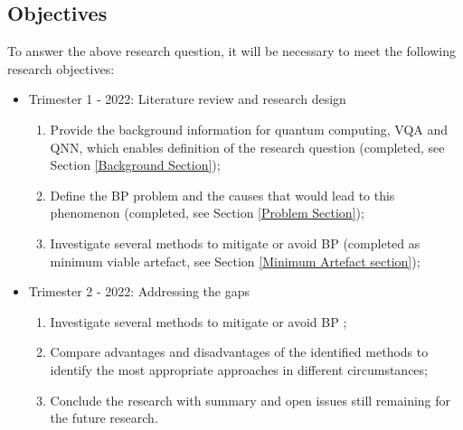 \subsection{Objectives}
To answer the above research question, it will be necessary to meet the following research objectives:
\begin{itemize}
    \item Trimester 1 - 2022: Literature review and research design
    \begin{enumerate}
        \item Provide the background information for quantum computing, VQA and QNN, which enables definition of the research question (completed, see Section \ref{Background Section});
        \item Define the BP problem and the causes that would lead to this phenomenon \cite{wangNoiseinducedBarrenPlateaus2021,zhaoAnalyzingBarrenPlateau2021} (completed, see Section \ref{Problem Section});
        \item Investigate several methods to mitigate or avoid BP \cite{pesahAbsenceBarrenPlateaus2021, pattiEntanglementDevisedBarren2021,liuParameterInitializationMethod2021} (completed as minimum viable artefact, see Section \ref{Minimum Artefact section});
    \end{enumerate}
    \item Trimester 2 - 2022: Addressing the gaps
    \begin{enumerate}
        \item Investigate several methods to mitigate or avoid BP \cite{pesahAbsenceBarrenPlateaus2021, pattiEntanglementDevisedBarren2021,liuParameterInitializationMethod2021};
    \item Compare advantages and disadvantages of the identified methods to identify the most appropriate approaches in different circumstances;
    \item Conclude the research with summary and open issues still remaining for the future research.
    \end{enumerate}
\end{itemize}
